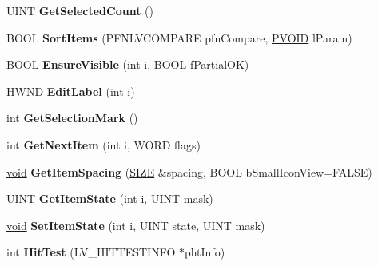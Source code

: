 \begin{DoxyCompactItemize}
U\+I\+NT {\bfseries Get\+Selected\+Count} ()
\item 
\mbox{\label{class_c_list_view_a30bdc75bf3bb75e6ed95df938c264d3a}} 
B\+O\+OL {\bfseries Sort\+Items} (P\+F\+N\+L\+V\+C\+O\+M\+P\+A\+RE pfn\+Compare, \hyperlink{interfacevoid}{P\+V\+O\+ID} l\+Param)
\item 
\mbox{\label{class_c_list_view_a63a4c04a843f1ab9bd8b9a2bf340975b}} 
B\+O\+OL {\bfseries Ensure\+Visible} (int i, B\+O\+OL f\+Partial\+OK)
\item 
\mbox{\label{class_c_list_view_a3c1ff61d7fdb71c5f3bfdbc22dd4547b}} 
\hyperlink{interfacevoid}{H\+W\+ND} {\bfseries Edit\+Label} (int i)
\item 
\mbox{\label{class_c_list_view_aee80f163089c43d15e8229fe4ab4a209}} 
int {\bfseries Get\+Selection\+Mark} ()
\item 
\mbox{\label{class_c_list_view_a07aaadfc44dfefd3cb63e73b3e8bdaf6}} 
int {\bfseries Get\+Next\+Item} (int i, W\+O\+RD flags)
\item 
\mbox{\label{class_c_list_view_abdd0c4d249f03eeac64b1ffbe854a747}} 
\hyperlink{interfacevoid}{void} {\bfseries Get\+Item\+Spacing} (\hyperlink{structtag_s_i_z_e}{S\+I\+ZE} \&spacing, B\+O\+OL b\+Small\+Icon\+View=F\+A\+L\+SE)
\item 
\mbox{\label{class_c_list_view_a0d43e9fbff00130770393a471e023646}} 
U\+I\+NT {\bfseries Get\+Item\+State} (int i, U\+I\+NT mask)
\item 
\mbox{\label{class_c_list_view_a31951267e68ad67bae6d4a87f12f7320}} 
\hyperlink{interfacevoid}{void} {\bfseries Set\+Item\+State} (int i, U\+I\+NT state, U\+I\+NT mask)
\item 
\mbox{\label{class_c_list_view_ad5a7784da6144d1dcd3535d433872429}} 
int {\bfseries Hit\+Test} (L\+V\+\_\+\+H\+I\+T\+T\+E\+S\+T\+I\+N\+FO $\ast$pht\+Info)
\item 
\mbox{\label{class_c_list_view_a4fcb8ba3961156c1688f49847e852db2}} 

\end{DoxyCompactItemize}
